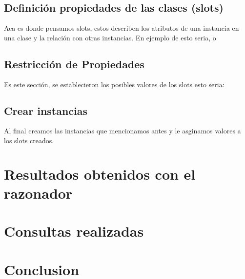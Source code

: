 \documentclass[12pt, titlepage, a4paper]{article}
\begin{document}
\subsection{Definición propiedades de las clases (slots)}
Aca es donde pensamos slots, estos describen los atributos de una instancia 
en una clase y la relación con otras instancias. En ejemplo de esto seria, 
 o 

\subsection{Restricción de Propiedades}
Es este sección, se establecieron los posibles valores de los slots esto 
seria:

\subsection{Crear instancias}
Al final creamos las instancias que mencionamos antes y le asginamos 
valores a los slots creados.

\section{Resultados obtenidos con el razonador}


\section{Consultas realizadas}

\section{Conclusion}
\end{document}

